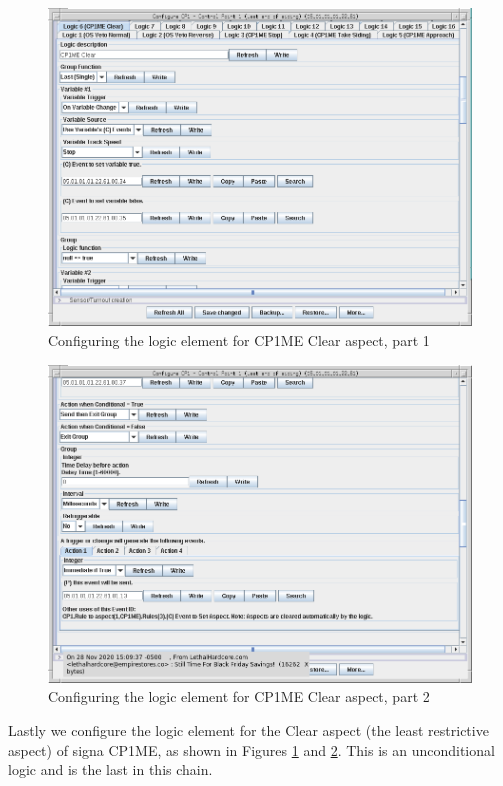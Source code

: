 \clearpage
\begin{figure}[hbpt]\begin{centering}%
\includegraphics[width=5in]{CP1ME-Clear-Logic-Config1.png}
\caption{Configuring the logic element for CP1ME Clear aspect, part 1}
\label{fig:CP1ME-Clear-Logic-Config1}
\end{centering}\end{figure}
\begin{figure}[hbpt]\begin{centering}%
\includegraphics[width=5in]{CP1ME-Clear-Logic-Config2.png}
\caption{Configuring the logic element for CP1ME Clear aspect, part 2}
\label{fig:CP1ME-Clear-Logic-Config2}
\end{centering}\end{figure}
Lastly we configure the logic element for the Clear aspect (the least 
restrictive aspect) of signa CP1ME, as shown in Figures 
\ref{fig:CP1ME-Clear-Logic-Config1} and 
\ref{fig:CP1ME-Clear-Logic-Config2}. This is an unconditional logic and is the 
last in this chain.


